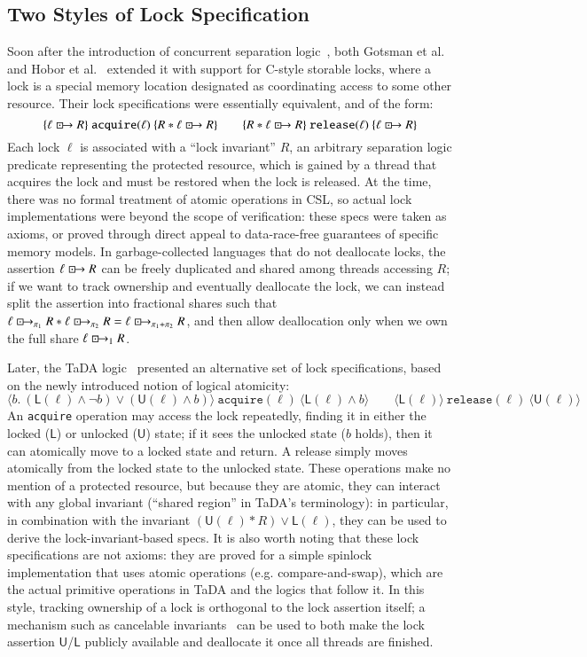 \documentclass[runningheads]{llncs}
\newcommand{\islock}{\boxdotright}
\begin{document}
\subsection{Two Styles of Lock Specification}
Soon after the introduction of concurrent separation logic~\cite{csl}, both Gotsman et al.~\cite{gotsman} and Hobor et al.~\cite{oraclesematic} extended it with support for C-style storable locks, where a lock is a special memory location designated as coordinating access to some other resource. Their lock specifications were essentially equivalent, and of the form:
$$\{ \ell \islock R \}\ \texttt{acquire}(\ell)\ \{ R * \ell \islock R \} \qquad \{ R * \ell \islock R \}\ \texttt{release}(\ell)\ \{ \ell \islock R \}$$
Each lock $\ell$ is associated with a ``lock invariant'' $R$, an arbitrary separation logic predicate representing the protected resource, which is gained by a thread that acquires the lock and must be restored when the lock is released. At the time, there was no formal treatment of atomic operations in CSL, so actual lock implementations were beyond the scope of verification: these specs were taken as axioms, or proved through direct appeal to data-race-free guarantees of specific memory models. In garbage-collected languages that do not deallocate locks, the assertion $\ell \islock R$ can be freely duplicated and shared among threads accessing $R$; if we want to track ownership and eventually deallocate the lock, we can instead split the assertion into fractional shares such that $\ell \islock_{\pi_1} R * \ell \islock_{\pi_2} R = \ell \islock_{\pi_1 + \pi_2} R$, and then allow deallocation only when we own the full share $\ell \islock_1 R$.

Later, the TaDA logic~\cite{tada} presented an alternative set of lock specifications, based on the newly introduced notion of logical atomicity:
$$\langle b.\ (\mathsf{L}(\ell) \land \neg b) \vee (\mathsf{U}(\ell) \land b) \rangle\ \texttt{acquire}(\ell)\ \langle \mathsf{L}(\ell) \land b \rangle \qquad \langle \mathsf{L}(\ell) \rangle\ \texttt{release}(\ell)\ \langle \mathsf{U}(\ell) \rangle$$
An \texttt{acquire} operation may access the lock repeatedly, finding it in either the locked ($\mathsf{L}$) or unlocked ($\mathsf{U}$) state; if it sees the unlocked state ($b$ holds), then it can atomically move to a locked state and return. A release simply moves atomically from the locked state to the unlocked state. These operations make no mention of a protected resource, but because they are atomic, they can interact with any global invariant (``shared region'' in TaDA's terminology): in particular, in combination with the invariant $(\mathsf{U}(\ell) * R) \vee \mathsf{L}(\ell)$, they can be used to derive the lock-invariant-based specs. It is also worth noting that these lock specifications are not axioms: they are proved for a simple spinlock implementation that uses atomic operations (e.g. compare-and-swap), which are the actual primitive operations in TaDA and the logics that follow it. In this style, tracking ownership of a lock is orthogonal to the lock assertion itself; a mechanism such as cancelable invariants~\cite{rustbelt-relaxed} can be used to both make the lock assertion $\mathsf{U}$/$\mathsf{L}$ publicly available and deallocate it once all threads are finished.
\end{document}

